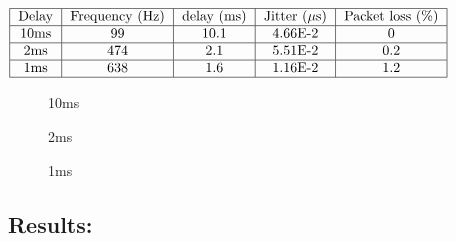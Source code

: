 \begin{center}
  $\begin{tabular}{|c|c|c|c|c|c|}
    \hline
    \text{Delay} & \text{Frequency (Hz)} & \text{delay (ms)} & \text{Jitter ($\mu$s)} & \text{Packet loss (\%)}\\
    \hline
    10ms & 99 & 10.1 & 4.66E-2 & 0 \\
    \hline
    2ms & 474 & 2.1 & 5.51E-2 & 0.2 \\
    \hline
    1ms & 638 & 1.6 & 1.16E-2 & 1.2 \\
    \hline
  \end{tabular}$
\end{center}
\begin{figure}[H]
	\centering
	
	\caption{10ms}
\end{figure} 
\begin{figure}[H]
		\centering
	    
	    \caption{2ms}
\end{figure} 
\begin{figure}[H]
	    \centering
	    
	    \caption{1ms}
\end{figure} 
% 	    
% 	    
% 	    

\subsection*{Results:}

